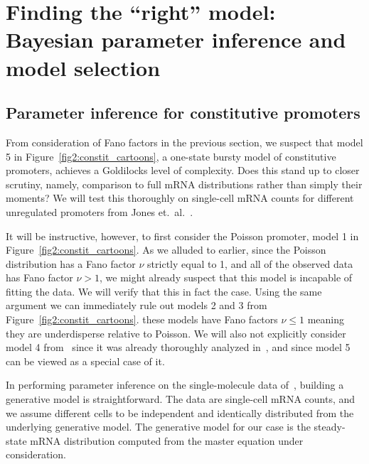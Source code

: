 \section{Finding the ``right'' model: Bayesian parameter inference and model 
selection}
\label{section_04_bayesian_inference}
\subsection{Parameter inference for constitutive promoters}

From consideration of Fano factors in the previous section, we suspect that
model 5 in Figure~\ref{fig2:constit_cartoons}, a one-state bursty model of
constitutive promoters, achieves a Goldilocks level of complexity. Does this
stand up to closer scrutiny, namely, comparison to full mRNA distributions
rather than simply their moments? We will test this thoroughly on
single-cell mRNA counts for different unregulated promoters from Jones et.\
al.~\cite{Jones2014}.

It will be instructive, however, to first consider the Poisson promoter, model 1
in Figure~\ref{fig2:constit_cartoons}. As we alluded to earlier, since the
Poisson distribution has a Fano factor $\nu$ strictly equal to 1, and all of
the observed data has Fano factor $\nu>1$, we might already suspect that this
model is incapable of fitting the data. We will verify that this in fact the
case. Using the same argument we can immediately rule out models 2 and 3 from 
Figure~\ref{fig2:constit_cartoons}. these models have Fano factors $\nu\le 1$
meaning they are underdisperse relative to Poisson. We will also not explicitly
consider model 4 from~\fig{fig2:constit_cartoons} since it was already thoroughly
analyzed in~\cite{Razo-Mejia2020}, and since model 5 can be viewed as a special
case of it.

In performing parameter inference on the single-molecule data
of~\cite{Jones2014}, building a generative model is straightforward. The data
are single-cell mRNA counts, and we assume different cells to be independent and
identically distributed from the underlying generative model. The generative
model for our case is the steady-state mRNA distribution computed from the
master equation under consideration.

